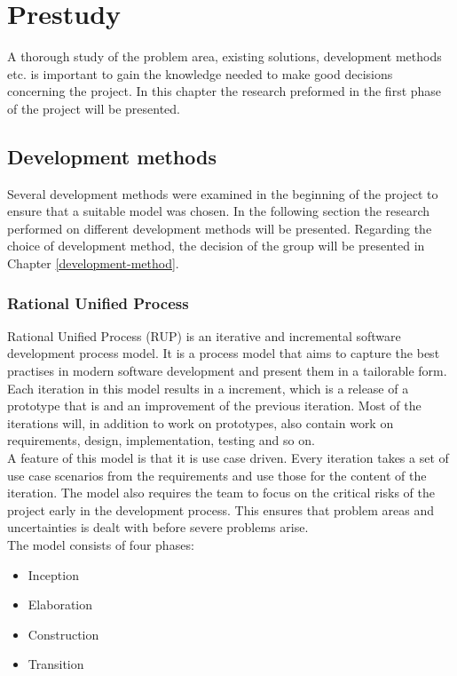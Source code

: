 \chapter{Prestudy}

\label{prestudy}

A thorough study of the problem area, existing solutions, development methods etc. is important to gain the knowledge needed to make good decisions concerning the project. In this chapter the research preformed in the first phase of the project will be presented. 

\section{Development methods}
Several development methods were examined in the beginning of the project to ensure that a suitable model was chosen. In the following section the research performed on different development methods will be presented. Regarding the choice of development method, the decision of the group will be presented in Chapter \ref{development-method}.

\subsection{Rational Unified Process}
Rational Unified Process (RUP) is an iterative and incremental software development process model. It is a process model that aims to capture the best practises in modern software development and present them in a tailorable form.\cite{kruchten} Each iteration in this model results in a increment, which is a release of a prototype that is and an improvement of the previous iteration. Most of the iterations will, in addition to work on prototypes, also contain work on requirements, design, implementation, testing and so on.\\
\newline
A feature of this model is that it is use case driven. Every iteration takes a set of use case scenarios from the requirements and use those for the content of the iteration. The model also requires the team to focus on the critical risks of the project early in the development process. This ensures that problem areas and uncertainties is dealt with before severe problems arise.\\
\newline
The model consists of four phases:

\begin{itemize}
\item{Inception}
\item{Elaboration}
\item{Construction}
\item{Transition}
\end{itemize}

